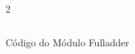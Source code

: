 \begin{figure}[H]
    \centering   
    \begin{tcolorbox}  
        \begin{multicols}{2} 
        \fontsize{9pt}{9pt}\selectfont\inputminted[obeytabs=true,tabsize=4,xleftmargin=20pt,linenos,breaklines]{VHDL}{VHDL/files/FULLADDER.vhd}    
        \end{multicols}
    \end{tcolorbox}   
    \caption{Código do Módulo Fulladder}
\end{figure}